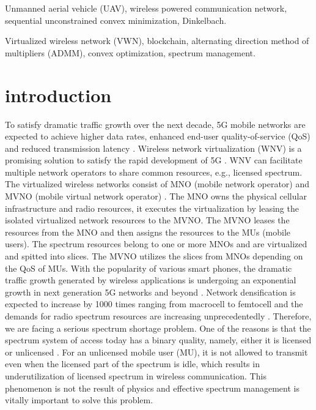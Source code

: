 \documentclass[journal]{IEEEtran}
\begin{document}
\begin{IEEEkeywords} Unmanned aerial vehicle (UAV), wireless powered communication network, sequential unconstrained convex minimization, Dinkelbach.
\begin{IEEEkeywords} Virtualized wireless network (VWN), blockchain, alternating direction method of multipliers (ADMM), convex optimization, spectrum management.
\end{IEEEkeywords}
\IEEEpeerreviewmaketitle
	
\section{introduction}
To satisfy dramatic traffic growth over the next decade, 5G mobile networks are expected to achieve higher data rates, enhanced end-user quality-of-service (QoS) and reduced transmission latency \cite{NPanwar,NAlFalahy}. Wireless network virtualization (WNV) is a promising solution to satisfy the rapid development of 5G \cite{CLiang}. WNV can facilitate multiple network operators to share common resources, e.g., licensed spectrum. The virtualized wireless networks consist of MNO (mobile network operator) and MVNO (mobile virtual network operator) \cite{RKokku}. The MNO owns the physical cellular infrastructure and radio
resources, it executes the virtualization by leasing the isolated virtualized network resources to the MVNO. The MVNO leases the resources from the MNO and then assigns the resources to the MUs (mobile users). The spectrum resources belong to one or more MNOs and are virtualized and spitted into slices. The MVNO utilizes the slices from MNOs depending on the QoS of MUs.
With the popularity of various smart phones, the dramatic traffic growth generated by wireless applications is undergoing an exponential growth in next generation 5G networks and beyond \cite{NPanwar,NAlFalahy}. Network densification is expected to increase by 1000 times ranging from macrocell to femtocell and the demands for radio spectrum resources are increasing unprecedentedly \cite{AYDing}. Therefore, we are facing a serious spectrum shortage problem. One of the reasons is that the spectrum system of access today has a binary quality, namely, either it is licensed or unlicensed \cite{JRosenworcel}. For an unlicensed mobile user (MU), it is not allowed to transmit even when the licensed part of the spectrum is idle, which results in underutilization of licensed spectrum in wireless communication. This phenomenon is not the result of physics and effective spectrum management is vitally important to solve this problem.


\end{IEEEkeywords}
\end{document}
